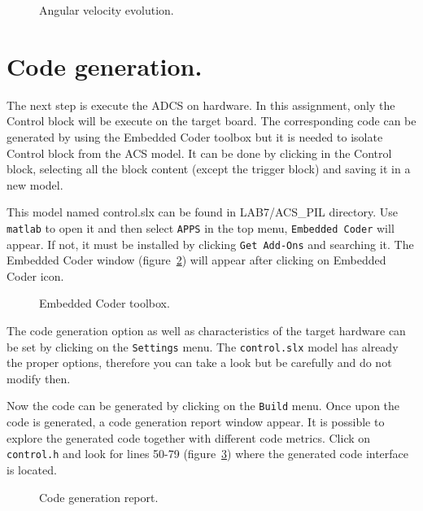 \begin{figure}[h]
            \caption{Angular velocity evolution.}

            \label{fig:scope}
\end{figure}

\section{Code generation.}

The next step is execute the ADCS on hardware. In this assignment, only the Control block will be execute on the target board.
The corresponding code can be generated by using the Embedded Coder toolbox but it is needed to isolate Control block from the ACS model. It can be done by clicking in the Control block, selecting all the block content (except the trigger block) and saving it in a new model. 

This model named control.slx can be found in LAB7/ACS\_PIL directory. Use {\tt matlab} to open it and then select {\tt APPS} in the top menu, {\tt Embedded Coder} will appear. If not, it must be installed by clicking {\tt Get Add-Ons} and searching it. The Embedded Coder window (figure~\ref{fig:control}) will appear after clicking on Embedded Coder icon.

\begin{figure}[h]
            \caption{Embedded Coder toolbox.}

            \label{fig:control}
\end{figure}

The code generation option as well as characteristics of the target hardware can be set by clicking on the {\tt Settings} menu. The {\tt control.slx} model has already the proper options, therefore you can take a look but be carefully and do not modify then.

Now the code can be generated by clicking on the {\tt Build} menu. Once upon the code is generated, a code generation report window appear. It is possible to explore the generated code together with different code metrics. Click on {\tt control.h} and look for lines 50-79 (figure~\ref{fig:code}) where the generated code interface is located.

\begin{figure}[h]
            \caption{Code generation report.}

            \label{fig:code}
\end{figure}

